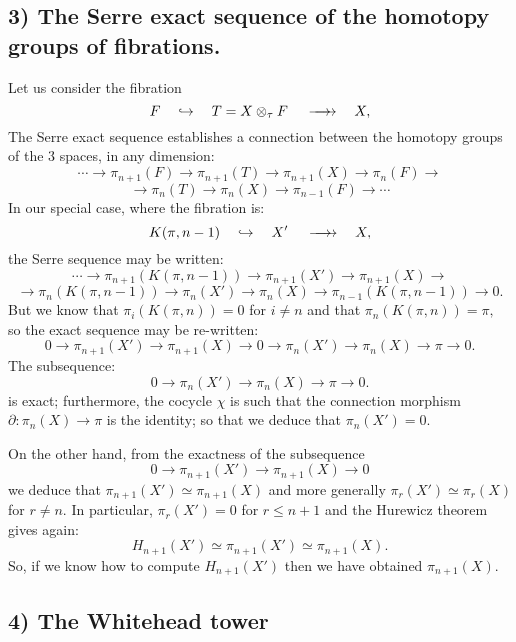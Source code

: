 \subsection* {3) The Serre exact sequence of the homotopy groups of fibrations.}

Let us consider the fibration
$$  F \quad \hookrightarrow\quad  T=X \otimes_\tau F \hskip 1.2em \longrightarrow \hskip -1.2em \longrightarrow
   \quad X,$$
The Serre exact sequence establishes a connection between the homotopy groups of the $3$ spaces,
in any  dimension:
$$\cdots \longrightarrow \pi_{n+1}(F) \longrightarrow \pi_{n+1}(T) \longrightarrow \pi_{n+1}(X)
         \longrightarrow \pi_n(F) \longrightarrow$$
$$\longrightarrow  \pi_n(T) \longrightarrow \pi_n(X)  \longrightarrow \pi_{n-1}(F) \longrightarrow \cdots $$
In our special case, where the fibration is:
$$  K(\pi, n-1) \quad \hookrightarrow\quad  X' \hskip 1.2em \longrightarrow \hskip -1.2em \longrightarrow
   \quad X,$$
the Serre sequence may be written:
$$\cdots \longrightarrow  \pi_{n+1}(K(\pi, n-1)) \longrightarrow \pi_{n+1}(X') \longrightarrow \pi_{n+1}(X)
 \longrightarrow $$
$$ \longrightarrow \pi_n(K(\pi, n-1)) \longrightarrow  \pi_n(X') \longrightarrow \pi_n(X)
 \longrightarrow \pi_{n-1}(K(\pi, n-1)) \longrightarrow 0. $$
But we know that $\pi_i(K(\pi,n))=0$ for $i \not= n$ and that $\pi_n(K(\pi, n))=\pi,$
so the exact sequence may be re-written:
$$  0 \rightarrow \pi_{n+1}(X') \rightarrow \pi_{n+1}(X) \rightarrow 0 \rightarrow  \pi_n(X')
      \rightarrow \pi_n(X) \rightarrow \pi \rightarrow 0. $$
The  subsequence:
$$ 0 \longrightarrow  \pi_n(X') \longrightarrow \pi_n(X)
 \longrightarrow \pi \longrightarrow 0. $$
is exact; furthermore, the cocycle $\chi$ is such that the connection morphism
$\partial: \pi_n(X) \rightarrow \pi$ is the identity; so that
we deduce that $ \pi_n (X')=0 $.
\par
On the other hand, from the exactness of the subsequence
$$  0 \longrightarrow \pi_{n+1}(X') \longrightarrow \pi_{n+1}(X)
 \longrightarrow 0 $$
we deduce that $ \pi_{n+1}(X') \simeq \pi_{n+1}(X)$
and more generally $ \pi_r(X') \simeq \pi_r(X)$ for $r \not= n.$
In particular, $\pi_r(X')=0$ for $r \leq n+1$ and the Hurewicz theorem gives again:
$$ H_{n+1}(X') \simeq \pi_{n+1}(X') \simeq  \pi_{n+1}(X).$$
So, if we know how to compute $H_{n+1}(X')$ then we  have obtained $\pi_{n+1}(X).$

\subsection* {4) The Whitehead tower}

